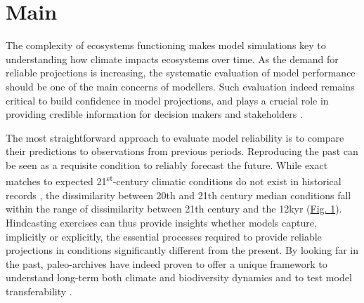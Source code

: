 \documentclass[pdflatex, sn-nature]{sn-jnl}%
\begin{document}
\maketitle

\newpage




\section{Main}
  
The complexity of ecosystems functioning makes model simulations key to understanding how climate impacts ecosystems over time. As the demand for reliable projections is increasing, the systematic evaluation of model performance should be one of the main concerns of modellers. Such evaluation indeed remains critical to build confidence in model projections, and plays a crucial role in providing credible information for decision makers and stakeholders \cite{Dawson2011, Mouquet2015, Pacifici2015}.

The most straightforward approach to evaluate model reliability is to compare their predictions to observations from previous periods. Reproducing the past can be seen as a requisite condition to reliably forecast the future. While exact matches to expected 21\textsuperscript{st}-century climatic conditions do not exist in historical records \cite{Burke2018}, the dissimilarity between 20th and 21th century median conditions fall within the range of dissimilarity between 21th century and the 12kyr (\hyperref[climatic_dissimilarity]{Fig. 1}). Hindcasting exercises can thus provide insights whether models capture, implicitly or explicitly, the essential processes required to provide reliable projections in conditions significantly different from the present. By looking far in the past, paleo-archives have indeed proven to offer a unique framework to understand long-term both climate and biodiversity dynamics \cite{Fordham2020} and to test model transferability  \cite{Braconnot2012, Maguire2015}.
\end{document}
